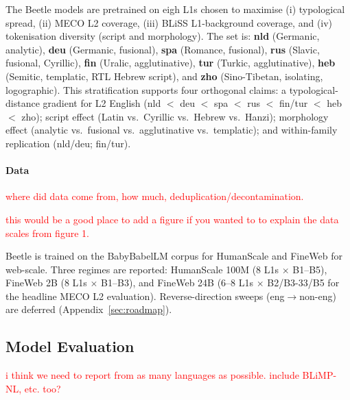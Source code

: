 \documentclass[11pt]{article}
\begin{document}
The Beetle models are pretrained on eigh L1s chosen to maximise (i) typological spread, (ii) MECO L2 coverage, (iii) BLiSS L1-background coverage, and (iv) tokenisation diversity (script and morphology). The set is: \textbf{nld} (Germanic, analytic), \textbf{deu} (Germanic, fusional), \textbf{spa} (Romance, fusional), \textbf{rus} (Slavic, fusional, Cyrillic), \textbf{fin} (Uralic, agglutinative), \textbf{tur} (Turkic, agglutinative), \textbf{heb} (Semitic, templatic, RTL Hebrew script), and \textbf{zho} (Sino-Tibetan, isolating, logographic). This stratification supports four orthogonal claims: a typological-distance gradient for L2 English (nld $<$ deu $<$ spa $<$ rus $<$ fin/tur $<$ heb $<$ zho); script effect (Latin vs.\ Cyrillic vs.\ Hebrew vs.\ Hanzi); morphology effect (analytic vs.\ fusional vs.\ agglutinative vs.\ templatic); and within-family replication (nld/deu; fin/tur).


\paragraph{Data}

\textcolor{red}{where did data come from, how much, deduplication/decontamination.}

\textcolor{red}{this would be a good place to add a figure if you wanted to to explain the data scales from figure 1.}

Beetle is trained on the BabyBabelLM corpus \citep{jumelet2025babybabellmmultilingualbenchmarkdevelopmentally} for HumanScale and FineWeb \citep{penedo2025fineweb2} for web-scale. Three regimes are reported: HumanScale 100M (8 L1s $\times$ B1--B5), FineWeb 2B (8 L1s $\times$ B1--B3), and FineWeb 24B (6--8 L1s $\times$ B2/B3-33/B5 for the headline MECO L2 evaluation). Reverse-direction sweeps (eng$\to$non-eng) are deferred (Appendix~\ref{sec:roadmap}).

\subsection{Model Evaluation}

\textcolor{red}{ i think we need to report from as many languages as possible. include BLiMP-NL, etc. too?}


\end{document}
